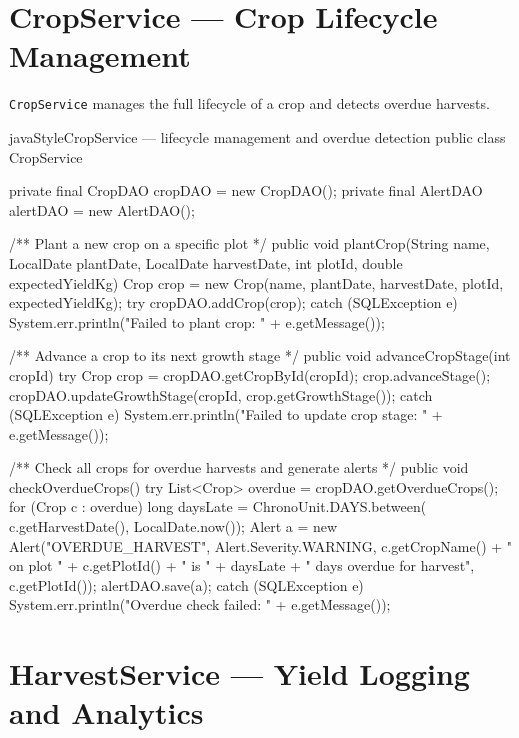 \documentclass[12pt, a4paper]{report}
\begin{document}
\section{CropService --- Crop Lifecycle Management}

\texttt{CropService} manages the full lifecycle of a crop and detects overdue harvests.

\begin{codeblock}{javaStyle}{CropService --- lifecycle management and overdue detection}
public class CropService {
    private final CropDAO    cropDAO    = new CropDAO();
    private final AlertDAO   alertDAO   = new AlertDAO();

    /** Plant a new crop on a specific plot */
    public void plantCrop(String name, LocalDate plantDate,
            LocalDate harvestDate, int plotId, double expectedYieldKg) {
        Crop crop = new Crop(name, plantDate, harvestDate,
                             plotId, expectedYieldKg);
        try {
            cropDAO.addCrop(crop);
        } catch (SQLException e) {
            System.err.println("Failed to plant crop: "
                + e.getMessage());
        }
    }

    /** Advance a crop to its next growth stage */
    public void advanceCropStage(int cropId) {
        try {
            Crop crop = cropDAO.getCropById(cropId);
            crop.advanceStage();
            cropDAO.updateGrowthStage(cropId, crop.getGrowthStage());
        } catch (SQLException e) {
            System.err.println("Failed to update crop stage: "
                + e.getMessage());
        }
    }

    /** Check all crops for overdue harvests and generate alerts */
    public void checkOverdueCrops() {
        try {
            List<Crop> overdue = cropDAO.getOverdueCrops();
            for (Crop c : overdue) {
                long daysLate = ChronoUnit.DAYS.between(
                    c.getHarvestDate(), LocalDate.now());
                Alert a = new Alert("OVERDUE_HARVEST",
                    Alert.Severity.WARNING,
                    c.getCropName() + " on plot " + c.getPlotId()
                    + " is " + daysLate + " days overdue for harvest",
                    c.getPlotId());
                alertDAO.save(a);
            }
        } catch (SQLException e) {
            System.err.println("Overdue check failed: "
                + e.getMessage());
        }
    }
}
\end{codeblock}

\section{HarvestService --- Yield Logging and Analytics}
\end{document}
